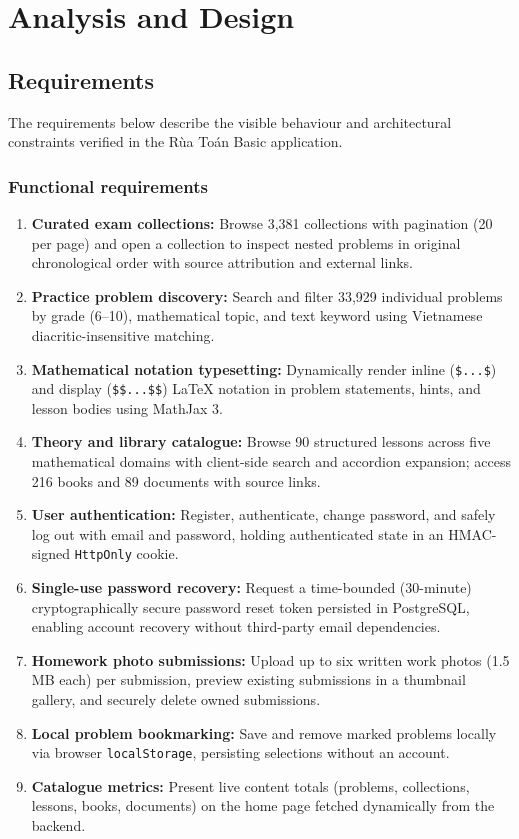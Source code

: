 \section{Analysis and Design}

\subsection{Requirements}
The requirements below describe the visible behaviour and architectural constraints verified in the
Rùa Toán Basic application.

\subsubsection{Functional requirements}
\begin{enumerate}[label=FR\arabic*.]
  \item \textbf{Curated exam collections:} Browse 3,381 collections with pagination (20 per page) and open
        a collection to inspect nested problems in original chronological order with source attribution and external links.
  \item \textbf{Practice problem discovery:} Search and filter 33,929 individual problems by grade (6--10),
        mathematical topic, and text keyword using Vietnamese diacritic-insensitive matching.
  \item \textbf{Mathematical notation typesetting:} Dynamically render inline (\texttt{\$...\$}) and display
        (\texttt{\$\$...\$\$}) LaTeX notation in problem statements, hints, and lesson bodies using MathJax 3.
  \item \textbf{Theory and library catalogue:} Browse 90 structured lessons across five mathematical domains with
        client-side search and accordion expansion; access 216 books and 89 documents with source links.
  \item \textbf{User authentication:} Register, authenticate, change password, and safely log out with email
        and password, holding authenticated state in an HMAC-signed \texttt{HttpOnly} cookie.
  \item \textbf{Single-use password recovery:} Request a time-bounded (30-minute) cryptographically secure password
        reset token persisted in PostgreSQL, enabling account recovery without third-party email dependencies.
  \item \textbf{Homework photo submissions:} Upload up to six written work photos (1.5 MB each) per submission,
        preview existing submissions in a thumbnail gallery, and securely delete owned submissions.
  \item \textbf{Local problem bookmarking:} Save and remove marked problems locally via
        browser \texttt{localStorage}, persisting selections without an account.
  \item \textbf{Catalogue metrics:} Present live content totals (problems, collections, lessons, books, documents)
        on the home page fetched dynamically from the backend.
\end{enumerate}


